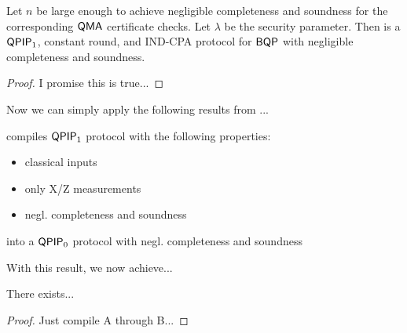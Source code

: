\begin{thm}
	Let $n$ be large enough to achieve negligible completeness and soundness for the corresponding $\operatorname{\mathsf{QMA}}$ certificate checks.
	Let $\lambda$ be the security parameter.
	Then  is a $\operatorname{\mathsf{QPIP}}_1$, constant round, and IND-CPA protocol for $\operatorname{\mathsf{BQP}}$ with negligible completeness and soundness.
\end{thm}
\begin{proof}
	I promise this is true...
\end{proof}

Now we can simply apply the following results from ...

\begin{thm}
	compiles $\operatorname{\mathsf{QPIP}}_1$ protocol with the following properties:
	\begin{itemize}
		\item classical inputs
		\item only X/Z measurements
		\item negl. completeness and soundness
	\end{itemize}
	into a $\operatorname{\mathsf{QPIP}}_0$ protocol with negl. completeness and soundness
\end{thm}

With this result, we now achieve...
\begin{thm}
	There exists...
\end{thm}
\begin{proof}
	Just compile A through B...
\end{proof}

